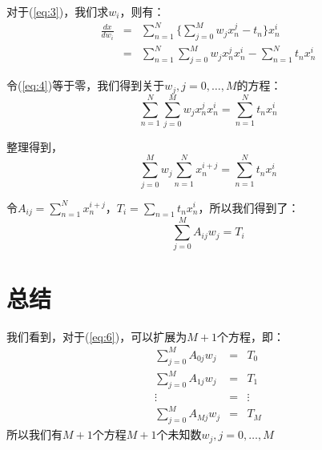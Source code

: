\documentclass[10pt,a4paper,UTF8]{article}
\begin{document}
对于(\ref{eq:3})，我们求\(w_{i}\)，则有：
\begin{eqnarray}
\label{eq:4}
\frac{dx}{dw_{i}}&=& \sum_{n=1}^{N} \{ \sum_{j=0}^{M}w_{j}x_{n}^{j} - t_{n} \}x_{n}^{i}   \\
&=& \sum_{n=1}^{N}\sum_{j=0}^{M}w_{j}x_{n}^{j} x_{n}^{i} - \sum_{n=1}^{N}t_{n}x_{n}^{i}
\end{eqnarray}

令(\ref{eq:4})等于零，我们得到关于\(w_{j},j=0,\ldots ,M\)的方程：
\begin{equation}
\label{eq:5}
\sum_{n=1}^{N}\sum_{j=0}^{M}w_{j}x_{n}^{j}x_{n}^{i} = \sum_{n=1}^{N}t_{n}x_{n}^{i}
\end{equation}

整理得到，
\begin{equation}
\label{eq:6}
\sum_{j=0}^{M}w_{j} \sum_{n=1}^{N} x_{n}^{i+j} = \sum_{n=1}^{N}t_{n}x_{n}^{i}
\end{equation}

令\(A_{ij} = \sum_{n=1}^{N} x_{n}^{i+j}\)，\(T_{i} = \sum_{n=1}t_{n}x_{n}^{i}\)，所以我们得到了：
\[\sum_{j=0}^{M} A_{ij}w_{j}=T_{i} \]
\section{总结}
\label{sec:org330dd01}


我们看到，对于(\ref{eq:6})，可以扩展为\(M+1\)个方程，即：
\begin{eqnarray*}
\sum_{j=0}^{M} A_{0j}w_{j} &=&T_{0} \\
\sum_{j=0}^{M} A_{1j}w_{j} &=&T_{1} \\
\vdots &=& \vdots \\
\sum_{j=0}^{M} A_{Mj}w_{j} &=&T_{M}
\end{eqnarray*}
所以我们有\(M+1\)个方程\(M+1\)个未知数\(w_{j},j=0,\ldots ,M\)
\end{document}
